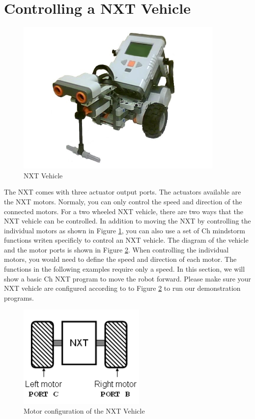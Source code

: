 \documentclass[11pt]{article}
\begin{document}
\section{Controlling a NXT Vehicle}
\begin{figure}[H]
  \begin{center}
    \includegraphics[height=3in]{figure/mindstorm/NXT_vehicle.png}
    \caption{NXT Vehicle\label{fig_NXT_vehicle}}
  \end{center}
\end{figure}
The NXT comes with three actuator output ports. The actuators available are the 
NXT motors. Normaly, you can only control the speed and direction of the connected 
motors. For a two wheeled NXT vehicle, there are two ways that the NXT vehicle can 
be controlled.  In addition to moving the NXT by controlling the individual motors 
as shown in Figure \ref{fig_NXT_vehicle}, you can also use a set of Ch mindstorm 
functions writen specificly to control an NXT vehicle. The diagram of the vehicle 
and the motor ports is shown in Figure \ref{fig_NXT_vehport}. When controlling the 
individual motors, you would need to define the speed and direction of each motor.
The functions in the following examples require only a speed. In this section, we 
will show a basic Ch NXT program to move the robot forward. Please make sure your 
NXT vehicle are configured according to to Figure \ref{fig_NXT_vehport} to run our 
demonstration programs.
\begin{figure}[h]
  \begin{center}
    \includegraphics[height=2in]{figure/mindstorm/Vehicle.png}
    \caption{Motor configuration of the NXT Vehicle \label{fig_NXT_vehport}}
  \end{center}
\end{figure}
\end{document}
